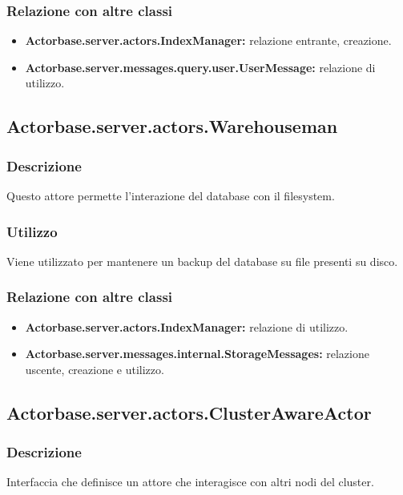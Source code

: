 \documentclass[a4paper]{article}
\begin{document}
			\subsubsection{Relazione con altre classi}
				\begin{itemize}
					\item \textbf{Actorbase.server.actors.IndexManager:} relazione entrante, creazione.
					\item \textbf{Actorbase.server.messages.query.user.UserMessage:} relazione di utilizzo.
				\end{itemize}
		
		\subsection{Actorbase.server.actors.Warehouseman}
			\subsubsection{Descrizione}
				Questo attore permette l'interazione del database con il filesystem.
				
			\subsubsection{Utilizzo}
				Viene utilizzato per mantenere un backup del database su file presenti su disco. 
				
			\subsubsection{Relazione con altre classi}
				\begin{itemize}
					\item \textbf{Actorbase.server.actors.IndexManager:} relazione di utilizzo.
					\item \textbf{Actorbase.server.messages.internal.StorageMessages:} relazione uscente, creazione e utilizzo.
				\end{itemize}
				
				\subsection{Actorbase.server.actors.ClusterAwareActor}
			\subsubsection{Descrizione}
				Interfaccia che definisce un attore che interagisce con altri nodi del cluster.
				
\end{document}
